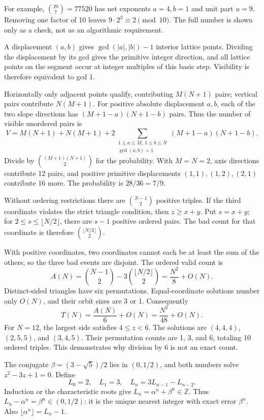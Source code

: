 For example, $\binom{20}{7}=77520$ has net exponents $a=4,b=1$ and unit part $u=9$. Removing one factor of 10 leaves $9\cdot2^3\equiv2\pmod{10}$. The full number is shown only as a check, not as an algorithmic requirement.

A displacement $(a,b)$ gives $\gcd(|a|,|b|)-1$ interior lattice points. Dividing the displacement by its gcd gives the primitive integer direction, and all lattice points on the segment occur at integer multiples of this basic step. Visibility is therefore equivalent to gcd 1.

Horizontally only adjacent points qualify, contributing $M(N+1)$ pairs; vertical pairs contribute $N(M+1)$. For positive absolute displacement $a,b$, each of the two slope directions has $(M+1-a)(N+1-b)$ pairs. Thus the number of visible unordered pairs is
\[
V=M(N+1)+N(M+1)
+2\sum_{\substack{1\le a\le M,\ 1\le b\le N\\\gcd(a,b)=1}}
(M+1-a)(N+1-b).
\]
Divide by $\binom{(M+1)(N+1)}2$ for the probability. With $M=N=2$, axis directions contribute 12 pairs, and positive primitive displacements $(1,1),(1,2),(2,1)$ contribute 16 more. The probability is $28/36=7/9$.

Without ordering restrictions there are $\binom{N-1}{2}$ positive triples. If the third coordinate violates the strict triangle condition, then $z\ge x+y$. Put $s=x+y$; for $2\le s\le\lfloor N/2\rfloor$, there are $s-1$ positive ordered pairs. The bad count for that coordinate is therefore $\binom{\lfloor N/2\rfloor}{2}$.

With positive coordinates, two coordinates cannot each be at least the sum of the others, so the three bad events are disjoint. The ordered valid count is
\[
A(N)=\binom{N-1}{2}-3\binom{\lfloor N/2\rfloor}{2}
=\frac{N^2}{8}+O(N).
\]
Distinct-sided triangles have six permutations. Equal-coordinate solutions number only $O(N)$, and their orbit sizes are 3 or 1. Consequently
\[
T(N)=\frac{A(N)}6+O(N)=\frac{N^2}{48}+O(N).
\]
For $N=12$, the largest side satisfies $4\le z<6$. The solutions are $(4,4,4)$, $(2,5,5)$, and $(3,4,5)$. Their permutation counts are 1, 3, and 6, totaling 10 ordered triples. This demonstrates why division by 6 is not an exact count.

The conjugate $\beta=(3-\sqrt5)/2$ lies in $(0,1/2)$, and both numbers solve $z^2-3z+1=0$. Define
\[
L_0=2,\quad L_1=3,\quad L_n=3L_{n-1}-L_{n-2}.
\]
Induction or the characteristic roots give $L_n=\alpha^n+\beta^n\in\mathbb Z$. Thus $L_n-\alpha^n=\beta^n\in(0,1/2)$: it is the unique nearest integer with exact error $\beta^n$. Also $\lfloor\alpha^n\rfloor=L_n-1$.

